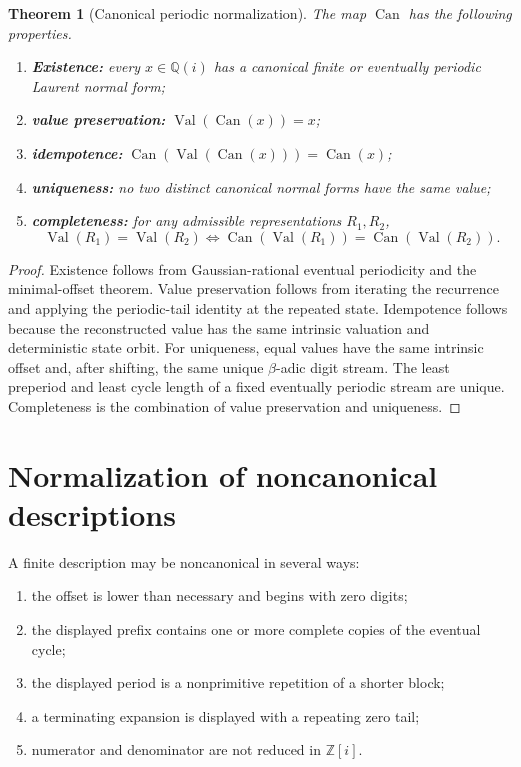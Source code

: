 \documentclass[11pt]{article}
\newtheorem{theorem}{Theorem}[section]
\theoremstyle{definition}
\newcommand{\Zi}{\mathbb{Z}[i]}
\newcommand{\Qi}{\mathbb{Q}(i)}
\newcommand{\Can}{\operatorname{Can}}
\newcommand{\Value}{\operatorname{Val}}
\begin{document}
\begin{theorem}[Canonical periodic normalization]
The map $\Can$ has the following properties.
\begin{enumerate}[label=(\alph*)]
\item \textbf{Existence:} every $x\in\Qi$ has a canonical finite or eventually periodic Laurent normal form;
\item \textbf{value preservation:} $\Value(\Can(x))=x$;
\item \textbf{idempotence:} $\Can(\Value(\Can(x)))=\Can(x)$;
\item \textbf{uniqueness:} no two distinct canonical normal forms have the same value;
\item \textbf{completeness:} for any admissible representations $R_1,R_2$,
\[
\Value(R_1)=\Value(R_2)
\iff
\Can(\Value(R_1))=\Can(\Value(R_2)).
\]
\end{enumerate}
\end{theorem}

\begin{proof}
Existence follows from Gaussian-rational eventual periodicity and the minimal-offset theorem.  Value preservation follows from iterating the recurrence and applying the periodic-tail identity at the repeated state.  Idempotence follows because the reconstructed value has the same intrinsic valuation and deterministic state orbit.  For uniqueness, equal values have the same intrinsic offset and, after shifting, the same unique $\beta$-adic digit stream.  The least preperiod and least cycle length of a fixed eventually periodic stream are unique.  Completeness is the combination of value preservation and uniqueness.
\end{proof}

\section{Normalization of noncanonical descriptions}

A finite description may be noncanonical in several ways:
\begin{enumerate}
\item the offset is lower than necessary and begins with zero digits;
\item the displayed prefix contains one or more complete copies of the eventual cycle;
\item the displayed period is a nonprimitive repetition of a shorter block;
\item a terminating expansion is displayed with a repeating zero tail;
\item numerator and denominator are not reduced in $\Zi$.
\end{enumerate}
\end{document}
